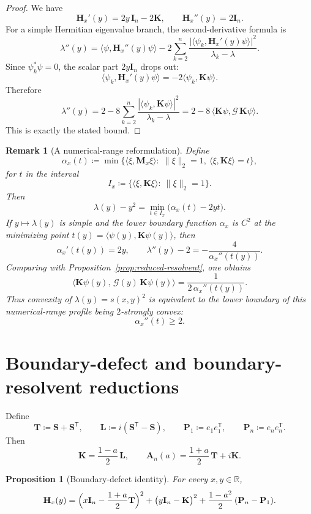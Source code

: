 \documentclass[11pt]{article}
\newtheorem{proposition}[theorem]{Proposition}
\newtheorem{remark}[theorem]{Remark}
\begin{document}
\begin{proof}
We have
\[
\mathbf H_x'(y)=2y\,\mathbf I_n-2\mathbf K,
\qquad
\mathbf H_x''(y)=2\mathbf I_n.
\]
For a simple Hermitian eigenvalue branch, the second-derivative formula is
\[
\lambda''(y)
=
\langle \psi,\mathbf H_x''(y)\psi\rangle
-
2\sum_{k=2}^n \frac{\bigl|\langle \psi_k,\mathbf H_x'(y)\psi\rangle\bigr|^2}{\lambda_k-\lambda}.
\]
Since \(\psi_k^*\psi=0\), the scalar part \(2y\mathbf I_n\) drops out:
\[
\langle \psi_k,\mathbf H_x'(y)\psi\rangle
=
-2\langle \psi_k,\mathbf K\psi\rangle.
\]
Therefore
\[
\lambda''(y)
=
2-8\sum_{k=2}^n \frac{|\langle \psi_k,\mathbf K\psi\rangle|^2}{\lambda_k-\lambda}
=
2-8\,\langle \mathbf K\psi,\mathcal G\,\mathbf K\psi\rangle.
\]
This is exactly the stated bound.
\end{proof}

\begin{remark}[A numerical-range reformulation]\label{rem:numerical-range}
Define
\[
\alpha_x(t)\coloneqq
\min\bigl\{
\langle \xi,\mathbf M_x\xi\rangle:\;
\|\xi\|_2=1,\ \langle \xi,\mathbf K\xi\rangle=t
\bigr\},
\]
for \(t\) in the interval
\[
I_x\coloneqq \{\langle \xi,\mathbf K\xi\rangle:\ \|\xi\|_2=1\}.
\]
Then
\[
\lambda(y)-y^2
=
\min_{t\in I_x}\bigl(\alpha_x(t)-2yt\bigr).
\]
If \(y\mapsto \lambda(y)\) is simple and the lower boundary function \(\alpha_x\) is \(C^2\) at the minimizing point \(t(y)=\langle \psi(y),\mathbf K\psi(y)\rangle\), then
\[
\alpha_x'(t(y))=2y,
\qquad
\lambda''(y)-2=-\frac{4}{\alpha_x''(t(y))}.
\]
Comparing with Proposition~\ref{prop:reduced-resolvent}, one obtains
\[
\bigl\langle \mathbf K\psi(y),\,\mathcal G(y)\,\mathbf K\psi(y)\bigr\rangle
=
\frac{1}{2\,\alpha_x''(t(y))}.
\]
Thus convexity of \(\lambda(y)=s(x,y)^2\) is equivalent to the lower boundary of this numerical-range profile being \(2\)-strongly convex:
\[
\alpha_x''(t)\ge 2.
\]
\end{remark}

\section{Boundary-defect and boundary-resolvent reductions}

Define
\[
\mathbf T\coloneqq \mathbf S+\mathbf S^{\mathsf T},
\qquad
\mathbf L\coloneqq i(\mathbf S^{\mathsf T}-\mathbf S),
\qquad
\mathbf P_1\coloneqq e_1e_1^{\mathsf T},
\qquad
\mathbf P_n\coloneqq e_ne_n^{\mathsf T}.
\]
Then
\[
\mathbf K=\frac{1-a}{2}\,\mathbf L,
\qquad
\mathbf A_n(a)=\frac{1+a}{2}\,\mathbf T+i\mathbf K.
\]

\begin{proposition}[Boundary-defect identity]\label{prop:boundary-defect}
For every \(x,y\in\mathbb R\),
\[
\mathbf H_x(y)
=
\Bigl(x\mathbf I_n-\frac{1+a}{2}\mathbf T\Bigr)^2
+
\bigl(y\mathbf I_n-\mathbf K\bigr)^2
+
\frac{1-a^2}{2}\,(\mathbf P_n-\mathbf P_1).
\]
\end{proposition}
\end{document}
